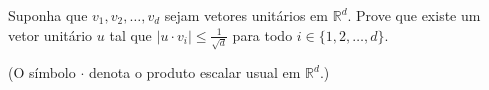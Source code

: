 Suponha que \({{v_1},{v_2},\dots,{v_d}}\) sejam vetores unitários em \({{\mathbb{R}^d}}\). Prove que existe um vetor unitário \({u}\) tal que \({\left| {u \cdot {v_i}} \right| \leq \frac{1}{{\sqrt d }}}\) para todo \(i \in \{ 1,2,\dots,d\}\).

(O símbolo \({ \cdot }\) denota o produto escalar usual em \({{\mathbb{R}^d}}\).)
